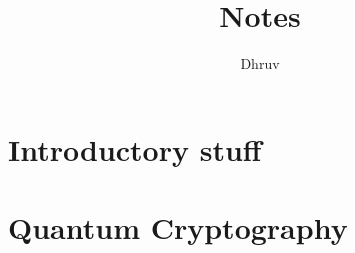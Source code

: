 \documentclass{easyclass}
\begin{document}
\begin{titlepage}
    \title{Notes}
    \author{Dhruv}
    \maketitle
\end{titlepage}

\tableofcontents

\chapter{Introductory stuff}


\chapter{Quantum Cryptography}

%
\end{document}
